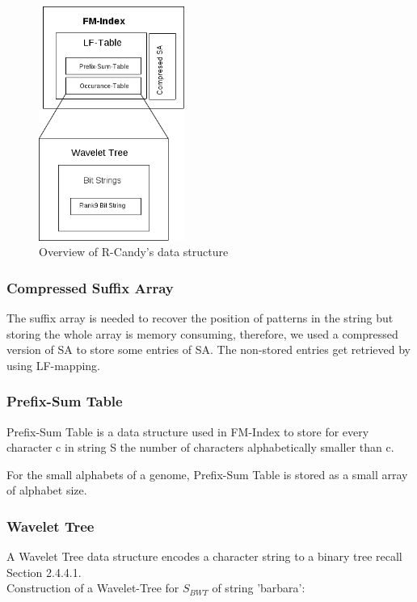 \documentclass[11pt,a4paper]{report}
\begin{document}
\begin{figure}[H]
\centering
\includegraphics[width=4.75cm]{pictures/DSOverview2.png}
\caption{Overview of R-Candy's data structure }
\label{DSOverview}
\end{figure}


\subsubsection{Compressed Suffix Array} \label{Compressed Suffix Array}
The suffix array is needed to recover the position of patterns in the string
but storing the whole array is memory consuming, therefore, we used a
compressed version of SA to store some entries of SA.
The non-stored entries get retrieved by using LF-mapping.

\subsubsection{Prefix-Sum Table} \label{Prefix-Sum Table}
Prefix-Sum Table is a data structure used in FM-Index to store for every 
character c in string S the number of characters alphabetically smaller than c.

For the small alphabets of a genome, Prefix-Sum Table is stored
as a small array of alphabet size.

\subsubsection{Wavelet Tree}  \label{Wavelet Tree}
A Wavelet Tree data structure encodes a character string to a
binary tree recall Section 2.4.4.1.\\

Construction of a Wavelet-Tree for $ S_{BWT} $ of string 'barbara':
\end{document}
